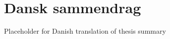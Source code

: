 \chapter{Dansk sammendrag}
\label{sec:dansk_sammendrag}


Placeholder for Danish translation of thesis summary